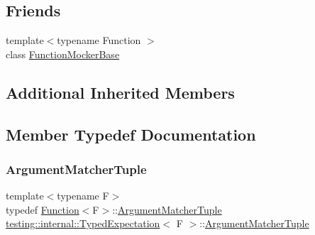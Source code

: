 \subsection*{Friends}
\begin{DoxyCompactItemize}
\item 
{\footnotesize template$<$typename Function $>$ }\\class \hyperlink{classtesting_1_1internal_1_1_typed_expectation_a1771ea4a3d92d8b2ff0f0aa6fc40ff55}{Function\+Mocker\+Base}
\end{DoxyCompactItemize}
\subsection*{Additional Inherited Members}


\subsection{Member Typedef Documentation}
\mbox{\label{classtesting_1_1internal_1_1_typed_expectation_a8f10e3906761cc5c10fa3561c6e8938e}} 
\subsubsection{\texorpdfstring{Argument\+Matcher\+Tuple}{ArgumentMatcherTuple}}
{\footnotesize\ttfamily template$<$typename F$>$ \\
typedef \hyperlink{structtesting_1_1internal_1_1_function}{Function}$<$F$>$\+::\hyperlink{classtesting_1_1internal_1_1_typed_expectation_a8f10e3906761cc5c10fa3561c6e8938e}{Argument\+Matcher\+Tuple} \hyperlink{classtesting_1_1internal_1_1_typed_expectation}{testing\+::internal\+::\+Typed\+Expectation}$<$ F $>$\+::\hyperlink{classtesting_1_1internal_1_1_typed_expectation_a8f10e3906761cc5c10fa3561c6e8938e}{Argument\+Matcher\+Tuple}}

\mbox{\label{classtesting_1_1internal_1_1_typed_expectation_a9a91379262d101f435809ba4556d14fa}} 
